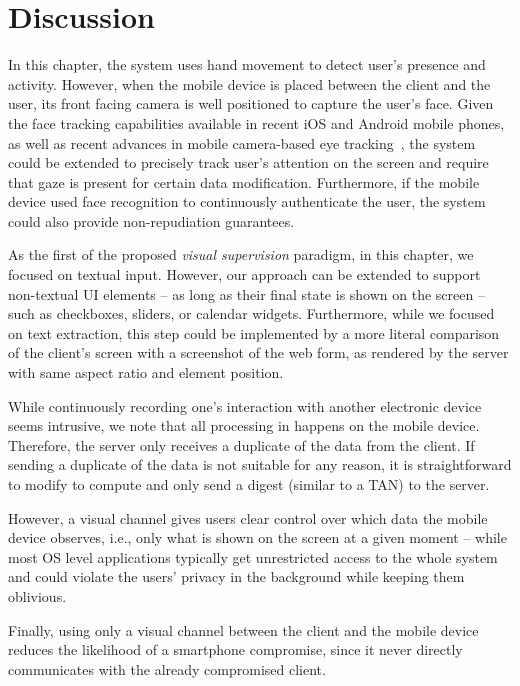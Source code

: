 
\section{Discussion} 
\label{integriscreen:sec:discussion}


In this chapter, the system uses hand movement to detect user's presence and activity.
However, when the mobile device is placed between the client and the user, its front facing camera is well positioned to capture the user's face.
Given the face tracking capabilities available in recent iOS and Android mobile phones, as well as recent advances in mobile camera-based eye tracking~\cite{krafka2016eye}, the system could be extended to precisely track user's attention on the screen and require that gaze is present for certain data modification.
Furthermore, if the mobile device used face recognition to continuously authenticate the user, the system could also provide non-repudiation guarantees.


As the first of the proposed \textit{visual supervision} paradigm, in this chapter, we focused on textual input.
However, our approach can be extended to support non-textual UI elements -- as long as their final state is shown on the screen -- such as checkboxes, sliders, or calendar widgets.
Furthermore, while we focused on text extraction, this step could be implemented by a more literal comparison of the client's screen with a screenshot of the web form, as rendered by the server with same aspect ratio and element position.

While continuously recording one's interaction with another electronic device seems intrusive, we note that all processing in \sysname happens on the mobile device.
Therefore, the server only receives a duplicate of the data from the client.
If sending a duplicate of the data is not suitable for any reason, it is straightforward to modify \name to compute and only send a digest (similar to a TAN) to the server.

However, a visual channel gives users clear control over which data the mobile device observes, i.e., only what is shown on the screen at a given moment -- while most OS level applications typically get unrestricted access to the whole system and could violate the users' privacy in the background while keeping them oblivious.

Finally, using only a visual channel between the client and the mobile device reduces the likelihood of a smartphone compromise, since it never directly communicates with the already compromised client.